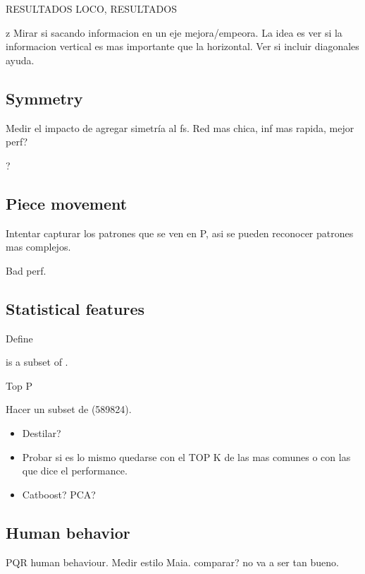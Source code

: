\vspace{2cm}

RESULTADOS LOCO, RESULTADOS

z
Mirar si sacando informacion en un eje mejora/empeora. La idea es ver si la informacion vertical es mas importante que la horizontal. Ver si incluir diagonales ayuda.

\subsection{Symmetry}

Medir el impacto de agregar simetría al fs. Red mas chica, inf mas rapida, mejor perf?

?

\subsection{Piece movement}

Intentar capturar los patrones que se ven en P, asi se pueden reconocer patrones mas complejos.


Bad perf.

\subsection{Statistical features}

Define 

 is a subset of .

Top P

Hacer un subset de  (589824).

\begin{itemize}
\item Destilar?
\item Probar si es lo mismo quedarse con el TOP K de las mas comunes o con las que dice el performance.
\item Catboost? PCA?
\end{itemize}

\subsection{Human behavior}

PQR human behaviour. Medir estilo Maia. comparar? no va a ser tan bueno.




